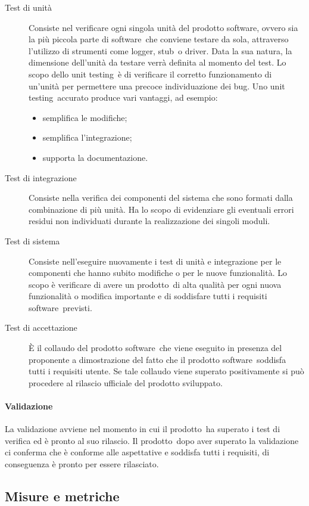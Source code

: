 \documentclass[../PianoDiQualifica.tex]{subfiles}
\begin{document}
					\begin{description}
						\item [Test di unità] Consiste nel verificare ogni singola unità del prodotto software\g, ovvero sia la più piccola parte di software\g\ che conviene testare da sola, attraverso l'utilizzo di strumenti come logger\g, stub\g\ o driver\g. Data la sua natura, la dimensione dell'unità da testare verrà definita al momento del test. Lo scopo dello unit testing\g\ è di verificare il corretto funzionamento di un'unità per permettere una precoce individuazione dei bug\g. Uno unit testing\g\ 
accurato produce vari vantaggi, ad esempio:
						\begin{itemize}
							\item semplifica le modifiche;
							\item semplifica l'integrazione;
							\item supporta la documentazione.
						\end{itemize}
						\item[Test di integrazione] Consiste nella verifica dei componenti del sistema che sono formati dalla combinazione di più unità. Ha lo scopo di evidenziare gli eventuali errori residui non individuati durante la realizzazione dei singoli moduli.
						\item[Test di sistema] Consiste nell'eseguire nuovamente i test di unità e integrazione per le componenti che hanno subito modifiche o per le nuove funzionalità. Lo scopo è verificare di avere un prodotto\g\ di alta qualità per ogni nuova funzionalità o modifica importante e di soddisfare tutti i requisiti software\g\ previsti.
						\item[Test di accettazione] È il collaudo del prodotto software\g\ che viene eseguito in presenza del proponente a dimostrazione del fatto che il prodotto 
software\g\ 
soddisfa tutti i requisiti utente. Se tale collaudo viene superato positivamente si può procedere al rilascio ufficiale del prodotto sviluppato. 
					\end{description}
				\paragraph{Validazione}
				La validazione avviene nel momento in cui il prodotto\g\ ha superato i test di verifica ed è pronto al suo rilascio. Il prodotto\g\ 
dopo aver superato la validazione ci conferma che è conforme alle aspettative e soddisfa tutti i requisiti, di conseguenza è pronto per essere rilasciato.
		\subsection{Misure e metriche}
\end{document}
